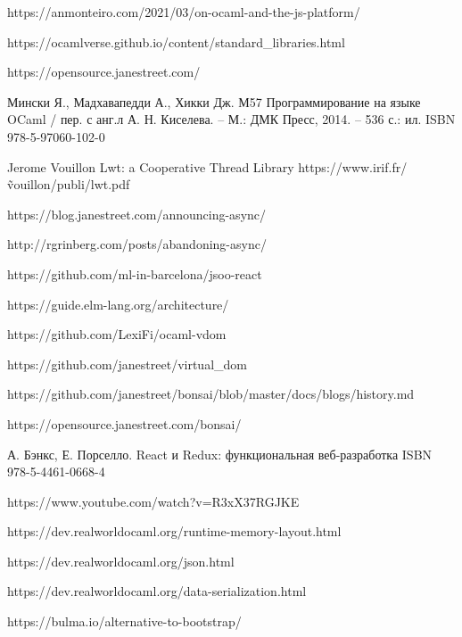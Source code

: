 \begin{thebibliography}{00}
    https://anmonteiro.com/2021/03/on-ocaml-and-the-js-platform/ \TODO

    https://ocamlverse.github.io/content/standard\_libraries.html \TODO

    https://opensource.janestreet.com/ \TODO

    Мински Я., Мадхавапедди А., Хикки Дж.
    М57 Программирование на языке OCaml / пер. с анг.л А. Н. Киселева. –
    М.: ДМК Пресс, 2014. – 536 с.: ил.
    ISBN 978-5-97060-102-0
    \TODO

    Jerome Vouillon Lwt: a Cooperative Thread Library \TODO
    https://www.irif.fr/\~vouillon/publi/lwt.pdf

    https://blog.janestreet.com/announcing-async/ \TODO

    http://rgrinberg.com/posts/abandoning-async/ \TODO

    https://github.com/ml-in-barcelona/jsoo-react \TODO

    https://guide.elm-lang.org/architecture/ \TODO

    https://github.com/LexiFi/ocaml-vdom \TODO

    https://github.com/janestreet/virtual\_dom \TODO

    https://github.com/janestreet/bonsai/blob/master/docs/blogs/history.md \TODO

    https://opensource.janestreet.com/bonsai/ \TODO

    А. Бэнкс, Е. Порселло. React и Redux: функциональная веб-разработка ISBN 978-5-4461-0668-4 \TODO

    https://www.youtube.com/watch?v=R3xX37RGJKE \TODO

    https://dev.realworldocaml.org/runtime-memory-layout.html \TODO

    https://dev.realworldocaml.org/json.html \TODO

    https://dev.realworldocaml.org/data-serialization.html \TODO

    https://bulma.io/alternative-to-bootstrap/ \TODO

\end{thebibliography}
\endgroup

